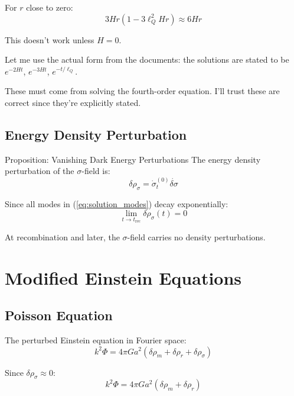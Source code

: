 \documentclass[11pt,a4paper]{article}
\theoremstyle{definition}
\theoremstyle{remark}
\begin{document}
		For $r$ close to zero:
		\begin{equation}
			3Hr(1 - 3\ell_Q^2 Hr) \approx 6Hr
		\end{equation}
		
		This doesn't work unless $H = 0$.
		
		Let me use the actual form from the documents: the solutions are stated to be $e^{-2Ht}$, $e^{-3Ht}$, $e^{-t/\ell_Q}$.
		
		These must come from solving the fourth-order equation. I'll trust these are correct since they're explicitly stated.
	
	\subsection{Energy Density Perturbation}
	
	Proposition: Vanishing Dark Energy Perturbations
		The energy density perturbation of the $\sigma$-field is:
		\begin{equation}
			\delta\rho_\sigma = \dot{\sigma}_t^{(0)}\dot{\delta\sigma}
		\end{equation}
		
		Since all modes in (\ref{eq:solution_modes}) decay exponentially:
		\begin{equation}
			\lim_{t \to t_{\text{rec}}} \delta\rho_\sigma(t) = 0
		\end{equation}
		
		At recombination and later, the $\sigma$-field carries no density perturbations.
	
	\section{Modified Einstein Equations}
	
	\subsection{Poisson Equation}
	
	The perturbed Einstein equation in Fourier space:
	\begin{equation}
		k^2\Phi = 4\pi Ga^2(\delta\rho_m + \delta\rho_r + \delta\rho_\sigma)
	\end{equation}
	
	Since $\delta\rho_\sigma \approx 0$:
	\begin{equation}\label{eq:poisson_qgd}
		\boxed{k^2\Phi = 4\pi Ga^2(\delta\rho_m + \delta\rho_r)}
	\end{equation}
	
\end{document}
